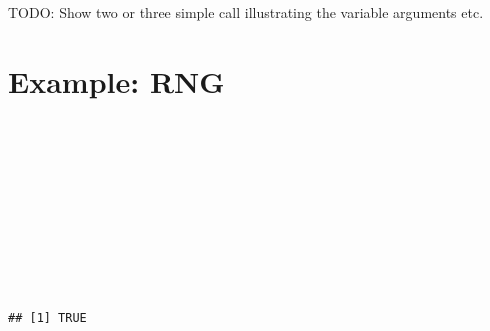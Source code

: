 TODO: Show two or three simple call illustrating the variable arguments etc.

\section{Example: RNG}

\begin{knitrout}
\color{fgcolor}\begin{kframe}
\begin{flushleft}
\ttfamily\noindent
{}\hlkeyword{(}\hlkeyword{)}\hspace*{\fill}\\
\hlstd{}\hspace*{\fill}\\
\hlstd{}\hspace*{\fill}\\
\hlstd{}\hlkeyword{(}\hlkeyword{)}\hspace*{\fill}\\
\hlstd{}\hlassignement{\usebox{\hlnormalsizeboxlessthan}-}{\ }\hlkeyword{(}\hlkeyword{)}\hspace*{\fill}\\
\hlstd{}\hspace*{\fill}\\
\hlstd{}\hspace*{\fill}\\
\hlstd{}\hlkeyword{(}\hlargument{=}\hlkeyword{)}\hspace*{\fill}\\
\hlstd{}\hlkeyword{(}\hlkeyword{)}\hspace*{\fill}\\
\hlstd{}\hlkeyword{(}\hlkeyword{\usebox{\hlnormalsizeboxdollar}}\hlkeyword{(}\hlkeyword{)}\hlkeyword{,}{\ }\hlkeyword{)}\mbox{}
\normalfont
\end{flushleft}
\begin{verbatim}
## [1] TRUE
\end{verbatim}
\end{kframe}
\end{knitrout}


